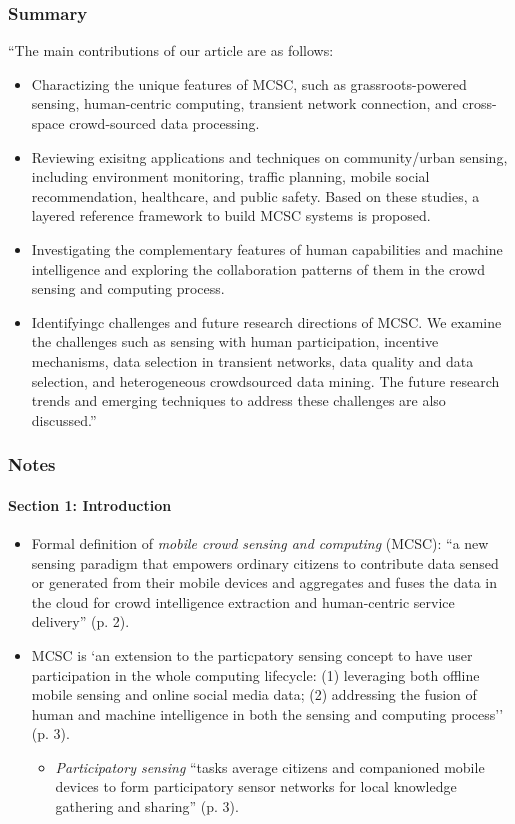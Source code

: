 \subsubsection*{Summary}
``The main contributions of our article are as follows:
	\begin{itemize}
	\item Charactizing the unique features of MCSC, such as grassroots-powered sensing, human-centric computing, transient network connection, and cross-space crowd-sourced data processing.
	\item Reviewing exisitng applications and techniques on community/urban sensing, including environment monitoring, traffic planning, mobile social recommendation, healthcare, and public safety. Based on these studies, a layered reference framework to build MCSC systems is proposed.
	\item Investigating the complementary features of human capabilities and machine intelligence and exploring the collaboration patterns of them in the crowd sensing and computing process.
	\item Identifyingc challenges and future research directions of MCSC. We examine the challenges such as sensing with human participation, incentive mechanisms, data selection in transient networks, data quality and data selection, and heterogeneous crowdsourced data mining. The future research trends and emerging techniques to address these challenges are also discussed.''
	\end{itemize}
\subsubsection*{Notes}
\paragraph{Section 1: Introduction}
\begin{itemize}
\item Formal definition of \emph{mobile crowd sensing and computing} (MCSC): ``a new sensing paradigm that empowers ordinary citizens to contribute data sensed or generated from their mobile devices and aggregates and fuses the data in the cloud for crowd intelligence extraction and human-centric service delivery'' (p. 2).
\item MCSC is `an extension to the particpatory sensing concept to have user participation in the whole computing lifecycle: (1) leveraging both offline mobile sensing and online social media data; (2) addressing the fusion of human and machine intelligence in both the sensing and computing process'' (p. 3).
	\begin{itemize}
	\item \emph{Participatory sensing} ``tasks average citizens and companioned mobile devices to form participatory sensor networks for local knowledge gathering and sharing'' (p. 3).
	\end{itemize}
\end{itemize}
